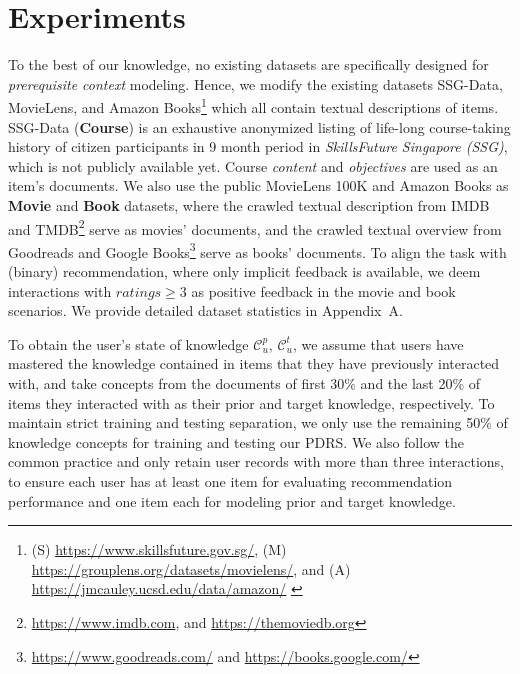 \section{Experiments}
\label{s:exp}


To the best of our knowledge, no existing datasets are specifically designed for \textit{prerequisite context} modeling.  
Hence, we modify the existing datasets SSG-Data, MovieLens, and Amazon Books\footnote{(S) \url{https://www.skillsfuture.gov.sg/}, (M) \url{https://grouplens.org/datasets/movielens/}, and (A) \url{https://jmcauley.ucsd.edu/data/amazon/} \label{fn:web}}
which all contain textual descriptions of items.
SSG-Data (\textbf{Course}) is an exhaustive anonymized listing of life-long course-taking history of citizen participants in 9 month period in \textit{SkillsFuture Singapore (SSG)}, which is not publicly available yet. Course \textit{content} and \textit{objectives} are used as an item's documents. 
We also use the public MovieLens 100K and Amazon Books as {\bf Movie} and {\bf Book} datasets, where the crawled textual description from IMDB and TMDB\footnote{\url{https://www.imdb.com}, and \url{ https://themoviedb.org}} serve as movies' documents, and the crawled textual overview from Goodreads and Google Books\footnote{\url{https://www.goodreads.com/} and \url{https://books.google.com/}} serve as books' documents.
To align the task with (binary) recommendation, where only implicit feedback is available, we deem interactions with $ratings \ge 3$ as positive feedback in the movie and book scenarios. We provide detailed dataset statistics in Appendix~A. 

To obtain the user's state of knowledge $\mathcal{C}_u^p$, $\mathcal{C}_u^t$, 
we assume that users have mastered the knowledge contained in items that they have previously interacted with,
and take concepts from the
documents of first 30\% and the last 20\% of items they interacted with as their prior and target knowledge, respectively.
To maintain strict training and testing separation, we only use the remaining 50\% of knowledge concepts for training and testing our PDRS. 
We also follow the common practice \cite{lei2020interactive} and only retain user records with more than three interactions, to ensure each user has at least one item for evaluating recommendation performance and one item each for modeling prior and target knowledge.

